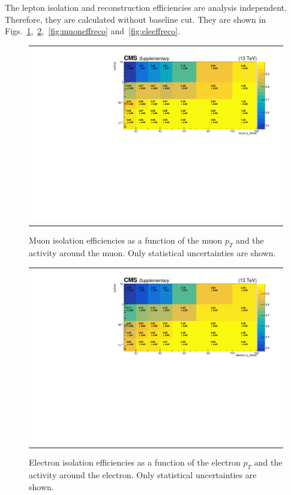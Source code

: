The lepton isolation and reconstruction efficiencies are analysis independent. Therefore, they are calculated without baseline cut. They are shown in Figs.~\ref{fig:muoneffiso},~\ref{fig:eleeffiso},~\ref{fig:muoneffreco} and~\ref{fig:eleeffreco}.

\begin{figure}[hptb]
\begin{center}
\begin{tabular}{c}
\includegraphics[width=1.0\textwidth]{sections/mc4/Backgrounds/LostLepton/figures/v3_2d_effs_mus_iso_no_baseline.pdf}
\end{tabular}
\end{center}
\caption{Muon isolation efficiencies as a function of the muon $p_T$ and the 
activity around the muon. Only statistical 
uncertainties are shown.}
\label{fig:muoneffiso}
\end{figure}

\begin{figure}[hptb]
\begin{center}
\begin{tabular}{c}
\includegraphics[width=1.0\textwidth]{sections/mc4/Backgrounds/LostLepton/figures/v3_2d_effs_els_iso_no_baseline.pdf}
\end{tabular}
\end{center}
\caption{Electron isolation efficiencies as a function of the electron $p_T$ and the activity around the electron. Only statistical uncertainties are shown.}
\label{fig:eleeffiso}
\end{figure}

